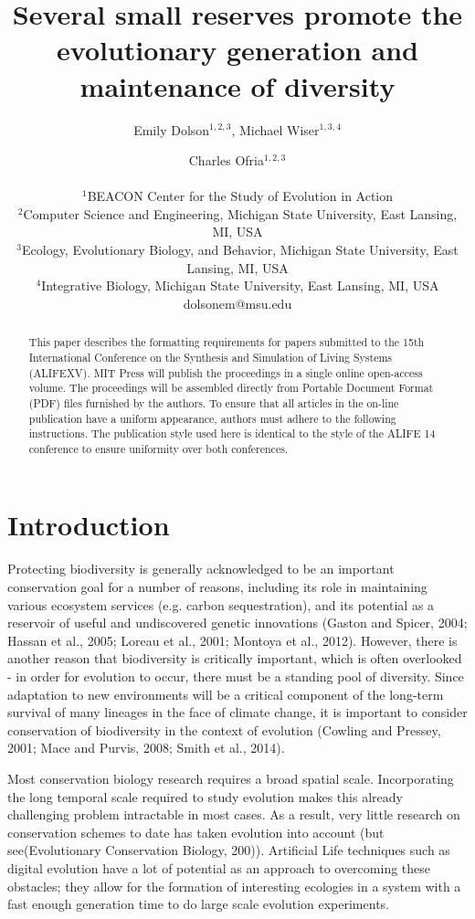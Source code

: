\documentclass[letterpaper]{article}
\title{Several small reserves promote the evolutionary generation and maintenance of diversity }
\author{Emily Dolson$^{1,2,3}$, Michael Wiser$^{1,3,4}$ \and Charles Ofria$^{1,2,3}$ \\
\mbox{}\\
$^1$BEACON Center for the Study of Evolution in Action  \\
$^2$Computer Science and Engineering, Michigan State University, East Lansing, MI, USA \\
$^3$Ecology, Evolutionary Biology, and Behavior, Michigan State University, East Lansing, MI, USA\\
$^4$Integrative Biology, Michigan State University, East Lansing, MI, USA\\
dolsonem@msu.edu}
\begin{document}
\maketitle

\begin{abstract}
This paper describes the formatting requirements for papers submitted to the 15th International Conference on the Synthesis and Simulation of Living Systems (ALIFEXV). MIT Press will publish the proceedings in a single online open-access volume.  The proceedings will be assembled directly from Portable Document Format (PDF) files furnished by the authors. To ensure that all articles in the on-line publication have a uniform appearance, authors must adhere to the following instructions. The publication style used here is identical to the style of the ALIFE 14 conference to ensure uniformity over both conferences.
\end{abstract}

\section{Introduction}

Protecting biodiversity is generally acknowledged to be an important conservation goal for a number of reasons, including its role in maintaining various ecosystem services (e.g. carbon sequestration), and its potential as a reservoir of useful and undiscovered genetic innovations (Gaston and Spicer, 2004; Hassan et al., 2005; Loreau et al., 2001; Montoya et al., 2012). However, there is another reason that biodiversity is critically important, which is often overlooked - in order for evolution to occur, there must be a standing pool of diversity. Since adaptation to new environments will be a critical component of the long-term survival of many lineages in the face of climate change, it is important to consider conservation of biodiversity in the context of evolution (Cowling and Pressey, 2001; Mace and Purvis, 2008; Smith et al., 2014). 

	Most conservation biology research requires a broad spatial scale. Incorporating the long temporal scale required to study evolution makes this already challenging problem intractable in most cases. As a result, very little research on conservation schemes to date has taken evolution into account (but see(Evolutionary Conservation Biology, 200)). Artificial Life techniques such as digital evolution have a lot of potential as an approach to overcoming these obstacles; they allow for the formation of interesting ecologies in a system with a fast enough generation time to do large scale evolution experiments.
    
\end{document}
